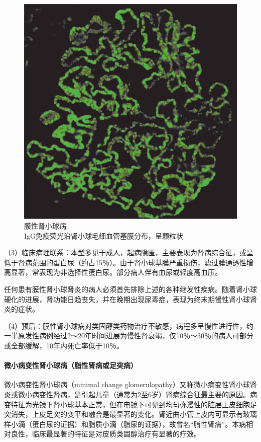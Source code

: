 \begin{figure}[!htbp]
 \centering
 \includegraphics{./images/Image00165.jpg}
 \captionsetup{justification=centering}
 \caption{膜性肾小球病\\ {\small IgG免疫荧光沿肾小球毛细血管基膜分布，呈颗粒状}}
\label{fig10-17}
  \end{figure}

（3）临床病理联系：本型多见于成人，起病隐匿，主要表现为肾病综合征，或呈低于肾病范围的蛋白尿（约占15％）。由于肾小球基膜严重损伤，滤过膜通透性增高显著，常表现为非选择性蛋白尿。部分病人伴有血尿或轻度高血压。

任何患有膜性肾小球肾炎的病人必须首先排除上述的各种继发性疾病。随着肾小球硬化的进展，肾功能日趋丧失，并在晚期出现尿毒症，表现为终末期慢性肾小球肾炎的症状。

（4）预后：膜性肾小球病对类固醇类药物治疗不敏感，病程多呈慢性进行性，约一半原发性病例经过2～20年时间进展为慢性肾衰竭，仅10％～30％的病人可部分或全部缓解，10年内死亡率低于10％。

\paragraph{微小病变性肾小球病（脂性肾病或足突病）}
微小病变性肾小球病（minimal change
glomerulopathy）又称微小病变性肾小球肾炎或微小病变性肾病，是引起儿童（通常为2至6岁）肾病综合征最主要的原因。病变特征为光镜下肾小球基本正常，但在电镜下可见到均匀弥漫性的脏层上皮细胞足突消失，上皮足突的变平和融合是最显著的变化。肾近曲小管上皮内可显示有玻璃样小滴（蛋白尿的证据）和脂质小滴（脂尿的证据），故曾名“脂性肾病”。本病相对良性，临床最显著的特征是对皮质类固醇治疗有显著的疗效。

